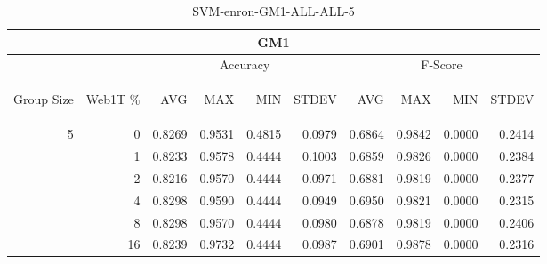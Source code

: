\begin{center}
\begin{table}[htbp] 
 \begin{center}
\begin{tabular}{ | r | r | r | r | r | r | r | r | r | r |}
\hline
\multicolumn{10}{|c|}{GM1}\\
\hline
 & & \multicolumn{4}{|c|}{Accuracy} & \multicolumn{4}{|c|}{F-Score}\\ \cline{3-10}
\begin{sideways}Group Size\end{sideways} & \begin{sideways}Web1T \%\end{sideways} & \begin{sideways}AVG\end{sideways} & \begin{sideways}MAX\end{sideways} & \begin{sideways}MIN\end{sideways} & \begin{sideways}STDEV\end{sideways} & \begin{sideways}AVG\end{sideways} & \begin{sideways}MAX\end{sideways} & \begin{sideways}MIN\end{sideways} & \begin{sideways}STDEV\end{sideways}\\
\hline
\multirow{5}{*}{5}
 & 0 & 0.8269 & 0.9531 & 0.4815 & 0.0979 & 0.6864 & 0.9842 & 0.0000 & 0.2414\\ \cline{2-10}
 & 1 & 0.8233 & 0.9578 & 0.4444 & 0.1003 & 0.6859 & 0.9826 & 0.0000 & 0.2384\\ \cline{2-10}
 & 2 & 0.8216 & 0.9570 & 0.4444 & 0.0971 & 0.6881 & 0.9819 & 0.0000 & 0.2377\\ \cline{2-10}
 & 4 & 0.8298 & 0.9590 & 0.4444 & 0.0949 & 0.6950 & 0.9821 & 0.0000 & 0.2315\\ \cline{2-10}
 & 8 & 0.8298 & 0.9570 & 0.4444 & 0.0980 & 0.6878 & 0.9819 & 0.0000 & 0.2406\\ \cline{2-10}
 & 16 & 0.8239 & 0.9732 & 0.4444 & 0.0987 & 0.6901 & 0.9878 & 0.0000 & 0.2316\\ \cline{2-10}
\hline
\end{tabular}
\caption{SVM-enron-GM1-ALL-ALL-5}
\label{table:SVM-enron-GM1-ALL-ALL-5}
\end{center}
 \end{table}
\end{center}

